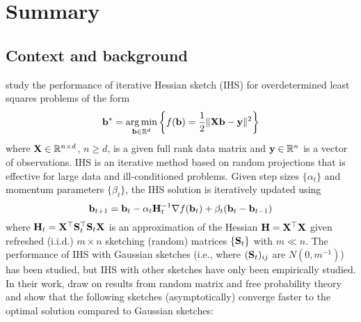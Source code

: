 

\section{Summary}

\subsection{Context and background}

\citet{Lacotte:2020} study the performance of iterative Hessian sketch (IHS) \citep{Pilanci:2016} for overdetermined least squares problems of the form
\[
\mathbf{b}^* = \operatorname*{arg\,min}_{\mathbf{b}\in\mathbb{R}^d}\left\{f(\mathbf{b}) = \frac{1}{2}\|\mathbf{X}\mathbf{b}-\mathbf{y}\|^2\right\}
\]
where $\mathbf{X}\in\mathbb{R}^{n\times d}$, $n\geq d$, is a given full rank data matrix and $\mathbf{y}\in\mathbb{R}^n$ is a vector of observations. IHS is an iterative method based on random projections that is effective for large data and ill-conditioned problems. Given step sizes $\{\alpha_t\}$ and momentum parameters $\{\beta_t\}$, the IHS solution is iteratively updated using
\[
\mathbf{b}_{t+1} = \mathbf{b}_t - \alpha_t\mathbf{H}_t^{-1}\nabla f(\mathbf{b}_t)+\beta_t(\mathbf{b}_t-\mathbf{b}_{t-1})
\]
where $\mathbf{H}_t=\mathbf{X}^\top \mathbf{S}_t^\top \mathbf{S}_t\mathbf{X}$ is an approximation of the Hessian $\mathbf{H}=\mathbf{X}^\top\mathbf{X}$ given refreshed (i.i.d.) $m\times n$ sketching (random) matrices $\{\mathbf{S}_t\}$ with $m\ll n$. The performance of IHS with Gaussian sketches (i.e., where $(\mathbf{S}_t)_{ij}$ are \iid $N(0,m^{-1})$) has been studied, but IHS with other sketches have only been empirically studied. In their work, \citet{Lacotte:2020} draw on results from random matrix and free probability theory and show that the following sketches (asymptotically) converge faster to the optimal solution compared to Gaussian sketches:
